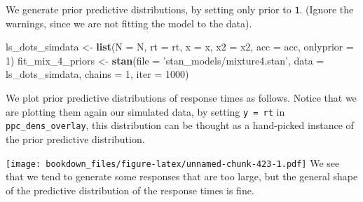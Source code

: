 \documentclass[12pt,]{krantz}
\newenvironment{Shaded}{\begin{snugshade}}{\end{snugshade}}
\newcommand{\DataTypeTok}[1]{\textcolor[rgb]{0.13,0.29,0.53}{#1}}
\newcommand{\DecValTok}[1]{\textcolor[rgb]{0.00,0.00,0.81}{#1}}
\newcommand{\KeywordTok}[1]{\textcolor[rgb]{0.13,0.29,0.53}{\textbf{#1}}}
\newcommand{\NormalTok}[1]{#1}
\newcommand{\OperatorTok}[1]{\textcolor[rgb]{0.81,0.36,0.00}{\textbf{#1}}}
\newcommand{\StringTok}[1]{\textcolor[rgb]{0.31,0.60,0.02}{#1}}
\theoremstyle{definition}
\theoremstyle{definition}
\theoremstyle{definition}
\theoremstyle{remark}
\begin{document}
We generate prior predictive distributions, by setting only prior to \texttt{1}. (Ignore the warnings, since we are not fitting the model to the data).

\begin{Shaded}
\begin{Highlighting}[]
\NormalTok{ls_dots_simdata <-}\StringTok{ }\KeywordTok{list}\NormalTok{(}\DataTypeTok{N =}\NormalTok{ N,}
                        \DataTypeTok{rt =}\NormalTok{ rt,}
                        \DataTypeTok{x =}\NormalTok{ x,}
                        \DataTypeTok{x2 =}\NormalTok{ x2,}
                        \DataTypeTok{acc =}\NormalTok{ acc,}
                        \DataTypeTok{onlyprior =} \DecValTok{1}\NormalTok{) }
\NormalTok{fit_mix_}\DecValTok{4}\NormalTok{_priors <-}\StringTok{ }\KeywordTok{stan}\NormalTok{(}\DataTypeTok{file =} \StringTok{'stan_models/mixture4.stan'}\NormalTok{,}
                         \DataTypeTok{data =}\NormalTok{ ls_dots_simdata,}
                         \DataTypeTok{chains =} \DecValTok{1}\NormalTok{, }\DataTypeTok{iter =} \DecValTok{1000}\NormalTok{)   }
\end{Highlighting}
\end{Shaded}

We plot prior predictive distributions of response times as follows. Notice that we are plotting them again our simulated data, by setting \texttt{y\ =\ rt} in \texttt{ppc\_dens\_overlay}, this distribution can be thought as a hand-picked instance of the prior predictive distribution.

\begin{Shaded}
\end{Shaded}

\texttt{[image: bookdown\_files/figure-latex/unnamed-chunk-423-1.pdf]}
We see that we tend to generate some responses that are too large, but the general shape of the predictive distribution of the response times is fine.
\end{document}
